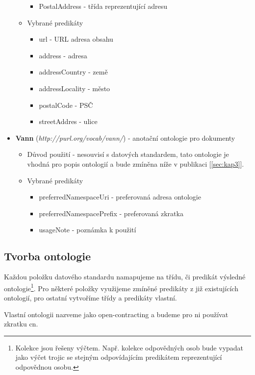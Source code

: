\begin{itemize}
\begin{itemize}
\begin{itemize}
		\item PostalAddress - třída reprezentující adresu 
		\end{itemize}
	\item Vybrané predikáty
		\begin{itemize}
		\item url - URL adresa obsahu
		\item address - adresa
		\item addressCountry - země
		\item addressLocality - město
		\item postalCode - PSČ
		\item streetAddres - ulice
		\end{itemize}
	\end{itemize}
\item \textbf{Vann} (\textit{http://purl.org/vocab/vann/})\cite{vann} - anotační ontologie pro dokumenty 
	\begin{itemize}
	\item Důvod použití - nesouvisí s datových standardem, tato ontologie je vhodná pro popis ontologií a bude zmíněna níže v publikaci [\ref{sec:kap3}].
	\item Vybrané predikáty
		\begin{itemize}
		\item preferredNamespaceUri - preferovaná adresa ontologie
		\item preferredNamespacePrefix - preferovaná zkratka
		\item usageNote - poznámka k použití
		\end{itemize}
	\end{itemize}

\end{itemize}

\newpage

\subsection{Tvorba ontologie}

Každou položku datového standardu namapujeme na třídu, či predikát výsledné ontologie\footnote{Kolekce jsou řešeny výčtem. Např. kolekce odpovědných osob bude vypadat jako výčet trojic se stejným odpovídajícím predikátem reprezentující odpovědnou osobu.}. Pro některé položky využijeme zmíněné predikáty z již existujících ontologií, pro ostatní vytvoříme třídy a predikáty vlastní.

Vlastní ontologii nazveme jako open-contracting a budeme pro ni používat zkratku cn.  

